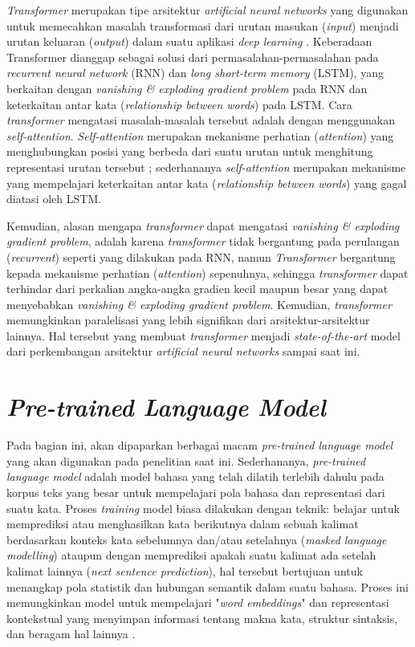 \emph{Transformer} merupakan tipe arsitektur \emph{artificial neural networks} yang digunakan untuk memecahkan masalah transformasi dari urutan masukan (\emph{input}) menjadi urutan keluaran (\emph{output}) dalam suatu aplikasi \emph{deep learning} \citep{transformers-self-attention-to-the-rescue}. Keberadaan Transformer dianggap sebagai solusi dari permasalahan-permasalahan pada \emph{recurrent neural network} (RNN) dan \emph{long short-term memory} (LSTM), yang berkaitan dengan \emph{vanishing \& exploding gradient problem} pada RNN dan keterkaitan antar kata (\emph{relationship between words}) pada LSTM. Cara \emph{transformer} mengatasi masalah-masalah tersebut adalah dengan menggunakan \emph{self-attention}. \emph{Self-attention} merupakan mekanisme perhatian (\emph{attention}) yang menghubungkan posisi yang berbeda dari suatu urutan untuk menghitung representasi urutan tersebut \citep{DBLP:journals/corr/VaswaniSPUJGKP17}; sederhananya \emph{self-attention} merupakan mekanisme yang mempelajari keterkaitan antar kata (\emph{relationship between words}) yang gagal diatasi oleh LSTM. 

Kemudian, alasan mengapa \emph{transformer} dapat mengatasi \emph{vanishing \& exploding gradient problem}, adalah karena \emph{transformer} tidak bergantung pada perulangan (\emph{recurrent}) seperti yang dilakukan pada RNN, namun \emph{Transformer} bergantung kepada mekanisme perhatian (\emph{attention}) sepenuhnya, sehingga \emph{transformer} dapat terhindar dari perkalian angka-angka gradien kecil maupun besar yang dapat menyebabkan \emph{vanishing \& exploding gradient problem}. Kemudian, \emph{transformer} memungkinkan paralelisasi yang lebih signifikan dari arsitektur-arsitektur lainnya. Hal tersebut yang membuat \emph{transformer} menjadi \emph{state-of-the-art} model dari perkembangan arsitektur \emph{artificial neural networks} sampai saat ini.

\section{\emph{Pre-trained Language Model}}
\label{2.5}
Pada bagian ini, akan dipaparkan berbagai macam \emph{pre-trained language model} yang akan digunakan pada penelitian saat ini. Sederhananya, \emph{pre-trained language model} adalah model bahasa yang telah dilatih terlebih dahulu pada korpus teks yang besar untuk mempelajari pola bahasa dan representasi dari suatu kata. Proses \emph{training} model biasa dilakukan dengan teknik: belajar untuk memprediksi atau menghasilkan kata berikutnya dalam sebuah kalimat berdasarkan konteks kata sebelumnya dan/atau setelahnya (\emph{masked language modelling}) ataupun dengan memprediksi apakah suatu kalimat ada setelah kalimat lainnya (\emph{next sentence prediction}), hal tersebut bertujuan untuk menangkap pola statistik dan hubungan semantik dalam suatu bahasa. Proses ini memungkinkan model untuk mempelajari "\emph{word embeddings}" dan representasi kontekstual yang menyimpan informasi tentang makna kata, struktur sintaksis, dan beragam hal lainnya \citep{radford2018improving}.

